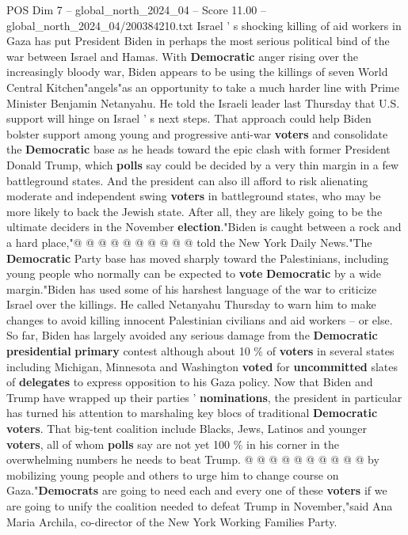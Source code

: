 \begin{textsample}{POS Dim 7 – global\_north\_2024\_04 – Score 11.00 – global\_north\_2024\_04/200384210.txt}  \label{ex:f7_pos_066}
Israel ' s shocking killing of aid workers in Gaza has put President Biden in perhaps the most serious political bind of the war between Israel and Hamas.
With \textbf{Democratic} anger rising over the increasingly bloody war, Biden appears to be using the killings of seven World Central Kitchen"angels"as an opportunity to take a much harder line with Prime Minister Benjamin Netanyahu.
He told the Israeli leader last Thursday that U.S. support will hinge on Israel ' s next steps.
That approach could help Biden bolster support among young and progressive anti-war \textbf{voters} and consolidate the \textbf{Democratic} base as he heads toward the epic clash with former President Donald Trump, which \textbf{polls} say could be decided by a very thin margin in a few battleground states.
And the president can also ill afford to risk alienating moderate and independent swing \textbf{voters} in battleground states, who may be more likely to back the Jewish state.
After all, they are likely going to be the ultimate deciders in the November \textbf{election}."Biden is caught between a rock and a hard place,"@ @ @ @ @ @ @ @ @ @ told the New York Daily News."The \textbf{Democratic} Party base has moved sharply toward the Palestinians, including young people who normally can be expected to \textbf{vote} \textbf{Democratic} by a wide margin."Biden has used some of his harshest language of the war to criticize Israel over the killings.
He called Netanyahu Thursday to warn him to make changes to avoid killing innocent Palestinian civilians and aid workers -- or else.
So far, Biden has largely avoided any serious damage from the \textbf{Democratic} \textbf{presidential} \textbf{primary} contest although about 10 \% of \textbf{voters} in several states including Michigan, Minnesota and Washington \textbf{voted} for \textbf{uncommitted} slates of \textbf{delegates} to express opposition to his Gaza policy.
Now that Biden and Trump have wrapped up their parties ' \textbf{nominations}, the president in particular has turned his attention to marshaling key blocs of traditional \textbf{Democratic} \textbf{voters}.
That big-tent coalition include Blacks, Jews, Latinos and younger \textbf{voters}, all of whom \textbf{polls} say are not yet 100 \% in his corner in the overwhelming numbers he needs to beat Trump. @ @ @ @ @ @ @ @ @ @ by mobilizing young people and others to urge him to change course on Gaza."\textbf{Democrats} are going to need each and every one of these \textbf{voters} if we are going to unify the coalition needed to defeat Trump in November,"said Ana Maria Archila, co-director of the New York Working Families Party.

\end{textsample}
